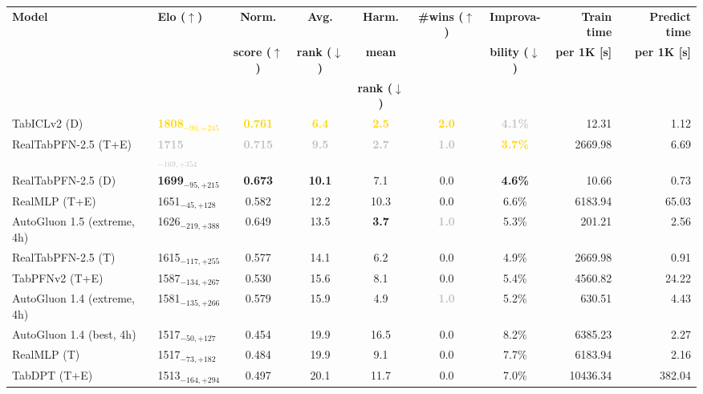 \begin{tabular}{llcccccrr}
\toprule
\textbf{Model} & \textbf{Elo ($\uparrow$)} & \textbf{Norm.} & \textbf{Avg.} & \textbf{Harm.} & \textbf{\#wins ($\uparrow$)} & \textbf{Improva-} & \textbf{Train time} & \textbf{Predict time} \\
 &  & \textbf{score ($\uparrow$)} & \textbf{rank ($\downarrow$)} & \textbf{mean} &  & \textbf{bility ($\downarrow$)} & \textbf{per 1K [s]} & \textbf{per 1K [s]} \\
 &  &  &  & \textbf{rank ($\downarrow$)} &  &  &  &  \\
\midrule
TabICLv2 (D) & \textcolor{gold}{\textbf{1808${}_{-90,+245}$}} & \textcolor{gold}{\textbf{0.761}} & \textcolor{gold}{\textbf{6.4}} & \textcolor{gold}{\textbf{2.5}} & \textcolor{gold}{\textbf{2.0}} & \textcolor{silver}{\textbf{4.1\%}} & 12.31 & 1.12 \\
RealTabPFN-2.5 (T+E) & \textcolor{silver}{\textbf{1715${}_{-169,+354}$}} & \textcolor{silver}{\textbf{0.715}} & \textcolor{silver}{\textbf{9.5}} & \textcolor{silver}{\textbf{2.7}} & \textcolor{silver}{\textbf{1.0}} & \textcolor{gold}{\textbf{3.7\%}} & 2669.98 & 6.69 \\
RealTabPFN-2.5 (D) & \textcolor{bronze}{\textbf{1699${}_{-95,+215}$}} & \textcolor{bronze}{\textbf{0.673}} & \textcolor{bronze}{\textbf{10.1}} & 7.1 & 0.0 & \textcolor{bronze}{\textbf{4.6\%}} & 10.66 & 0.73 \\
RealMLP (T+E) & 1651${}_{-45,+128}$ & 0.582 & 12.2 & 10.3 & 0.0 & 6.6\% & 6183.94 & 65.03 \\
AutoGluon 1.5 (extreme, 4h) & 1626${}_{-219,+388}$ & 0.649 & 13.5 & \textcolor{bronze}{\textbf{3.7}} & \textcolor{silver}{\textbf{1.0}} & 5.3\% & 201.21 & 2.56 \\
RealTabPFN-2.5 (T) & 1615${}_{-117,+255}$ & 0.577 & 14.1 & 6.2 & 0.0 & 4.9\% & 2669.98 & 0.91 \\
TabPFNv2 (T+E) & 1587${}_{-134,+267}$ & 0.530 & 15.6 & 8.1 & 0.0 & 5.4\% & 4560.82 & 24.22 \\
AutoGluon 1.4 (extreme, 4h) & 1581${}_{-135,+266}$ & 0.579 & 15.9 & 4.9 & \textcolor{silver}{\textbf{1.0}} & 5.2\% & 630.51 & 4.43 \\
AutoGluon 1.4 (best, 4h) & 1517${}_{-50,+127}$ & 0.454 & 19.9 & 16.5 & 0.0 & 8.2\% & 6385.23 & 2.27 \\
RealMLP (T) & 1517${}_{-73,+182}$ & 0.484 & 19.9 & 9.1 & 0.0 & 7.7\% & 6183.94 & 2.16 \\
TabDPT (T+E) & 1513${}_{-164,+294}$ & 0.497 & 20.1 & 11.7 & 0.0 & 7.0\% & 10436.34 & 382.04 \\

\end{tabular}
